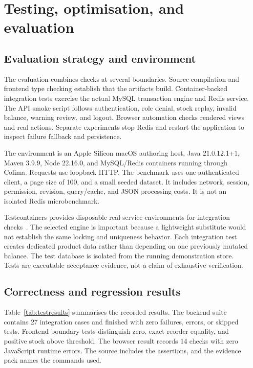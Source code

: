 \chapter{Testing, optimisation, and evaluation}\label{ch:evaluation}
\section{Evaluation strategy and environment}
The evaluation combines checks at several boundaries. Source compilation and frontend type checking establish that the artifacts build. Container-backed integration tests exercise the actual MySQL transaction engine and Redis service. The API smoke script follows authentication, role denial, stock replay, invalid balance, warning review, and logout. Browser automation checks rendered views and real actions. Separate experiments stop Redis and restart the application to inspect failure fallback and persistence.

The environment is an Apple Silicon macOS authoring host, Java 21.0.12.1+1, Maven 3.9.9, Node 22.16.0, and MySQL/Redis containers running through Colima. Requests use loopback HTTP. The benchmark uses one authenticated client, a page size of 100, and a small seeded dataset. It includes network, session, permission, revision, query/cache, and JSON processing costs. It is not an isolated Redis microbenchmark.

Testcontainers provides disposable real-service environments for integration checks~\citep{testcontainers}. The selected engine is important because a lightweight substitute would not establish the same locking and uniqueness behavior. Each integration test creates dedicated product data rather than depending on one previously mutated balance. The test database is isolated from the running demonstration store. Tests are executable acceptance evidence, not a claim of exhaustive verification.

\section{Correctness and regression results}
Table~\ref{tab:testresults} summarises the recorded results. The backend suite contains 27 integration cases and finished with zero failures, errors, or skipped tests. Frontend boundary tests distinguish zero, exact reorder equality, and positive stock above threshold. The browser result records 14 checks with zero JavaScript runtime errors. The source includes the assertions, and the evidence pack names the commands used.

